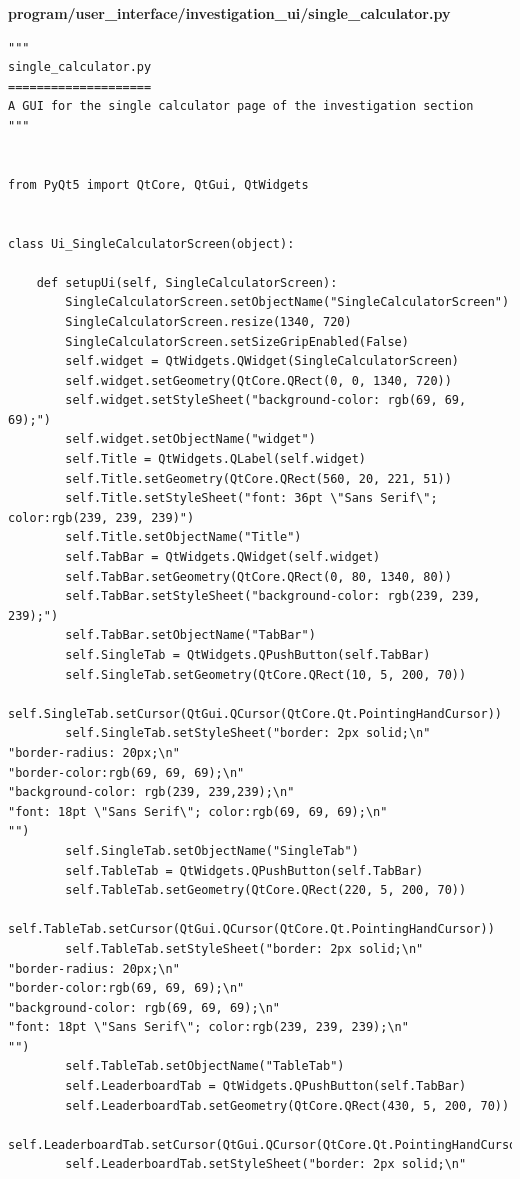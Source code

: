 \documentclass[12pt]{article}
\begin{document}
\textbf{program/user\_interface/investigation\_ui/single\_calculator.py}
\begin{lstlisting}
"""
single_calculator.py
====================
A GUI for the single calculator page of the investigation section
"""


from PyQt5 import QtCore, QtGui, QtWidgets


class Ui_SingleCalculatorScreen(object):

    def setupUi(self, SingleCalculatorScreen):
        SingleCalculatorScreen.setObjectName("SingleCalculatorScreen")
        SingleCalculatorScreen.resize(1340, 720)
        SingleCalculatorScreen.setSizeGripEnabled(False)
        self.widget = QtWidgets.QWidget(SingleCalculatorScreen)
        self.widget.setGeometry(QtCore.QRect(0, 0, 1340, 720))
        self.widget.setStyleSheet("background-color: rgb(69, 69, 69);")
        self.widget.setObjectName("widget")
        self.Title = QtWidgets.QLabel(self.widget)
        self.Title.setGeometry(QtCore.QRect(560, 20, 221, 51))
        self.Title.setStyleSheet("font: 36pt \"Sans Serif\"; color:rgb(239, 239, 239)")
        self.Title.setObjectName("Title")
        self.TabBar = QtWidgets.QWidget(self.widget)
        self.TabBar.setGeometry(QtCore.QRect(0, 80, 1340, 80))
        self.TabBar.setStyleSheet("background-color: rgb(239, 239, 239);")
        self.TabBar.setObjectName("TabBar")
        self.SingleTab = QtWidgets.QPushButton(self.TabBar)
        self.SingleTab.setGeometry(QtCore.QRect(10, 5, 200, 70))
        self.SingleTab.setCursor(QtGui.QCursor(QtCore.Qt.PointingHandCursor))
        self.SingleTab.setStyleSheet("border: 2px solid;\n"
"border-radius: 20px;\n"
"border-color:rgb(69, 69, 69);\n"
"background-color: rgb(239, 239,239);\n"
"font: 18pt \"Sans Serif\"; color:rgb(69, 69, 69);\n"
"")
        self.SingleTab.setObjectName("SingleTab")
        self.TableTab = QtWidgets.QPushButton(self.TabBar)
        self.TableTab.setGeometry(QtCore.QRect(220, 5, 200, 70))
        self.TableTab.setCursor(QtGui.QCursor(QtCore.Qt.PointingHandCursor))
        self.TableTab.setStyleSheet("border: 2px solid;\n"
"border-radius: 20px;\n"
"border-color:rgb(69, 69, 69);\n"
"background-color: rgb(69, 69, 69);\n"
"font: 18pt \"Sans Serif\"; color:rgb(239, 239, 239);\n"
"")
        self.TableTab.setObjectName("TableTab")
        self.LeaderboardTab = QtWidgets.QPushButton(self.TabBar)
        self.LeaderboardTab.setGeometry(QtCore.QRect(430, 5, 200, 70))
        self.LeaderboardTab.setCursor(QtGui.QCursor(QtCore.Qt.PointingHandCursor))
        self.LeaderboardTab.setStyleSheet("border: 2px solid;\n"

\end{lstlisting}
\end{document}
